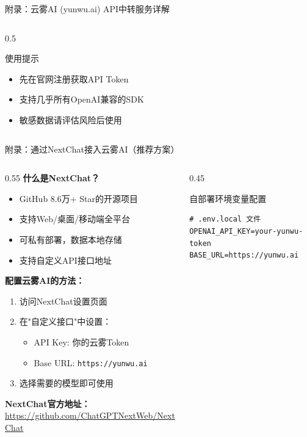 \documentclass[aspectratio=169,11pt]{beamer}
\begin{document}
\begin{frame}[fragile]{附录：云雾AI (yunwu.ai) API中转服务详解}
\begin{columns}
\begin{column}{0.5\textwidth}
            \begin{alertblock}{使用提示}
                \begin{itemize}
                    \item 先在官网注册获取API Token
                    \item 支持几乎所有OpenAI兼容的SDK
                    \item 敏感数据请评估风险后使用
                \end{itemize}
            \end{alertblock}
        \end{column}
    \end{columns}
\end{frame}

\begin{frame}[fragile]{附录：通过NextChat接入云雾AI（推荐方案）}
    \begin{columns}
        \begin{column}{0.55\textwidth}
            \textbf{什么是NextChat？}
            \begin{itemize}
                \item GitHub 8.6万+ Star的开源项目
                \item 支持Web/桌面/移动端全平台
                \item 可私有部署，数据本地存储
                \item 支持自定义API接口地址
            \end{itemize}
            
            \vspace{0.3cm}
            \textbf{配置云雾AI的方法：}
            \begin{enumerate}
                \item 访问NextChat设置页面
                \item 在"自定义接口"中设置：
                    \begin{itemize}
                        \item API Key: 你的云雾Token
                        \item Base URL: \texttt{https://yunwu.ai}
                    \end{itemize}
                \item 选择需要的模型即可使用
            \end{enumerate}
            
            \vspace{0.3cm}
            \textbf{NextChat官方地址：}\\
            \url{https://github.com/ChatGPTNextWeb/NextChat}
        \end{column}
        \begin{column}{0.45\textwidth}
            \begin{block}{自部署环境变量配置}
                \begin{lstlisting}[basicstyle=\ttfamily\tiny]
# .env.local 文件
OPENAI_API_KEY=your-yunwu-token
BASE_URL=https://yunwu.ai


\end{lstlisting}
\end{block}
\end{column}
\end{columns}
\end{frame}
\end{document}
